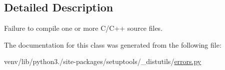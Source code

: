 \subsection{Detailed Description}
\begin{DoxyVerb}Failure to compile one or more C/C++ source files.\end{DoxyVerb}
 

The documentation for this class was generated from the following file\+:\begin{DoxyCompactItemize}
\item 
venv/lib/python3./site-\/packages/setuptools/\+\_\+distutils/\hyperlink{__distutils_2errors_8py}{errors.\+py}\end{DoxyCompactItemize}
